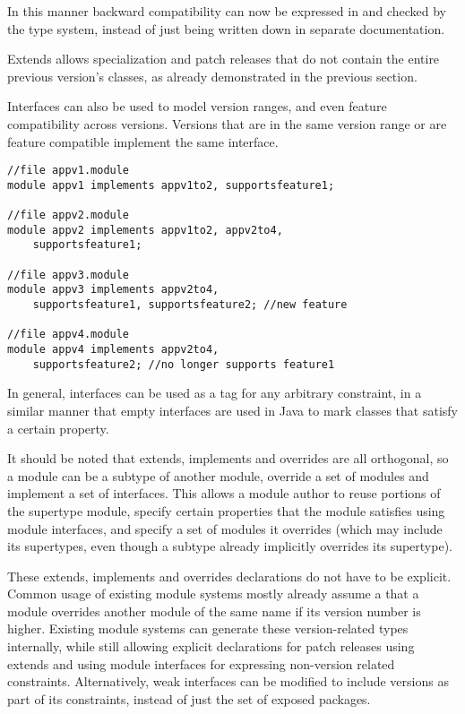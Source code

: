In this manner backward compatibility can now be expressed in 
and checked by the type system, instead of just being written
down in separate documentation.

Extends allows specialization and patch releases that do not contain 
the entire previous version's classes, as already demonstrated in
the previous section. 

Interfaces can also be used to model version ranges, and even feature
compatibility across versions. Versions that are in the same version 
range or are feature compatible implement the same interface.

\begin{lstlisting}[caption=Interfaces as Properties]
//file appv1.module
module appv1 implements appv1to2, supportsfeature1;

//file appv2.module
module appv2 implements appv1to2, appv2to4, 
	supportsfeature1;

//file appv3.module
module appv3 implements appv2to4, 
	supportsfeature1, supportsfeature2; //new feature

//file appv4.module
module appv4 implements appv2to4, 
	supportsfeature2; //no longer supports feature1
\end{lstlisting}

In general, interfaces can be used as a tag for any arbitrary constraint, 
in a similar manner that empty interfaces are used in Java to mark classes 
that satisfy a certain property.

It should be noted that extends, implements and overrides are all orthogonal,
so a module can be a subtype of another module, override a set of modules and
implement a set of interfaces. This allows a module author to reuse portions
of the supertype module, specify certain properties that the module satisfies
using module interfaces, and specify a set of modules it overrides (which may
include its supertypes, even though a subtype already implicitly overrides
its supertype).

These extends, implements and overrides declarations do not have to be explicit.
Common usage of existing module systems mostly already assume a that a 
module overrides another module of the same name if its version 
number is higher. Existing module systems can generate these version-related types 
internally, while still allowing explicit declarations for patch releases 
using extends and using module interfaces for expressing non-version
related constraints. Alternatively, weak interfaces can be modified to include
versions as part of its constraints, instead of just the set of exposed packages.

